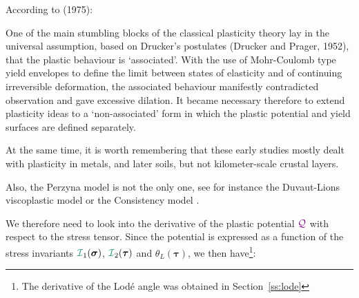 According to \textcite{zihl75} (1975):
\begin{displayquote}
{\color{darkgray}
One of the main stumbling blocks of the 
classical plasticity theory lay in the universal
assumption, based on Drucker's postulates (Drucker and Prager, 1952), that the plastic 
behaviour is `associated'. With the use of Mohr-Coulomb type yield envelopes to define the
limit between states of elasticity and of continuing irreversible deformation,
the associated behaviour manifestly contradicted observation and gave excessive dilation.
It became necessary therefore to extend plasticity ideas to a `non-associated'
form in which the plastic potential and yield surfaces are defined separately.}
\end{displayquote}
At the same time, it is worth remembering that these early studies mostly dealt
with plasticity in metals, and later soils, but not kilometer-scale crustal layers.

Also, the Perzyna model is not the only one, see for instance
the Duvaut-Lions viscoplastic model or the Consistency model \cite{wasd97,hesd02}.

We therefore need to look into the derivative of the plastic potential ${{\color{violet}\cal Q}}$
with respect to the stress tensor. Since the potential 
is expressed as a function of the stress invariants ${\III}_1(\bm\sigma)$,
${\III}_2(\bm\tau)$ and $\theta_L(\bm\tau)$, we then have\footnote{
The derivative of the Lod\'e angle was obtained in Section~\ref{ss:lode}}:

